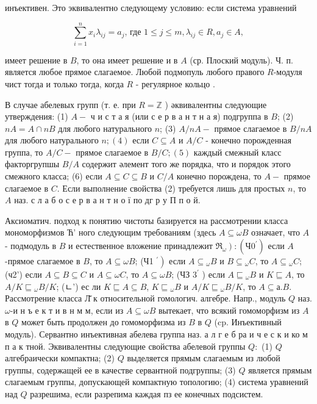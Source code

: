 \documentclass[10pt]{article}
\begin{document}
инъективен. Это эквивалентно следующему условию: если система уравнений



\[

\sum_{i=1}^{n} x_{i} \lambda_{i j}=a_{j} \text {, где } 1 \leqslant j \leqslant m, \lambda_{i j} \in R, a_{j} \in A,

\]



имеет решение в $B$, то она имеет решение и в $A$ (ср. Плоский модуль). Ч. п. является любое прямое слагаемое. Любой подмопуль любого правого $R$-модуля чист тогда и только тогда, когда $R$ - регулярное кольцо .



В случае абелевых групп (т. е. при $R=\mathbb{Z}$ ) әквивалентны следующие утверждения: (1) $A-$ ч и с т а я (или с е р в а н т н а я) подгруппа в $B$; (2) $n A=A \cap n B$ для любого натурального $n$; (3) $A / n A-$ прямое слагаемое в $B / n A$ для любого натурального $n ;(4)$ если $C \subseteq A$ и $A / C$ - конечно порожденная группа, то $A / C-$ прямое слагаемое в $B / C ;(5)$ каждый смежный класс факторгрупшы $B / A$ содержит әлемент того же порядка, что и порядок этого смежного класса; (6) если $A \subseteq C \subseteq B$ и $C / A$ конечно порождена, то $A-$ прямое слагаемое в $C$. Если выполнение свойства (2) требуется лишь для простых $n$, то $A$ наз. с л а б о с е р в а н т н о ї по дг р у П п о й.



Аксиоматич. подход к понятию чистоты базируется на рассмотрении класса мономорфизмов Ћ' ного следующим требованиям (здесь $A \subseteq \omega B$ означает, что $A$ - подмодуль в $B$ и естественное вложение принадлежит $\left.\mathscr{\Re}_{\omega}\right):\left(Ч 0^{\prime}\right)$ если $A$-прямое слагаемое в $B$, то $A \subseteq \omega B$; (Ч1 $\left.{ }^{\prime}\right)$ если $A \subseteq{ }_{\omega} B$ и $B \subseteq{ }_{\omega} C$, то $A \subseteq{ }_{\omega} C$; (ч2') если $A \subseteq B \subseteq C$ и $A \subseteq \omega C$, то $A \subseteq \omega B$; (ЧЗ $3^{\prime}$ ) если $A \sqsubseteq{ }_{\omega} B$ и $K \sqsubseteq A$, то $A / K \sqsubseteq{ }_{\omega} B / K$; (ㄴ') ес ли $K \sqsubseteq A \subseteq B$, $K \sqsubseteq{ }_{\omega} B$ и $A / K \sqsubseteq{ }_{\omega} B / K$, то $A \subseteq а . B$. Рассмотрение класса Л̆ к относительной гомологич. алгебре. Напр., модуль $Q$ наз. $\omega$-и н ъ е к т и в н м м, если из $A \subseteq \omega B$ вытекает, что всякий гомоморфизм из $A$ в $Q$ может быть продолжен до гомоморфизма из $B$ в $Q$ (cp. Инъективный модуль). Сервантно инъективная абелева группа наз. а л г е б ра и ч е с к и ко м п а к тной. Эквивалентны следующие свойства абелевой группы $Q:$ (1) $Q$ алгебраически компактна; (2) $Q$ выделяется прямым слагаемым из любой группы, содержащей ее в качестве сервантной подгруппы; (3) $Q$ является прямым слагаемым группы, допускающей компактную топологию; (4) система уравнений над $Q$ разрешима, если разрепима каждая пз ее конечных подсистем.
\end{document}
